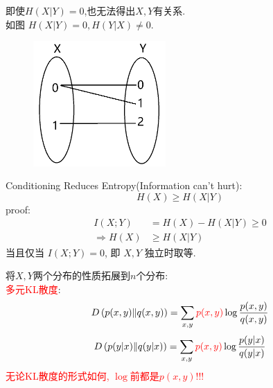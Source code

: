 \begin{proposition}
即使$H(X|Y)=0$,也无法得出$X,Y$有关系.\\
如图 $H(X|Y)=0,H(Y|X)\neq 0$.
\begin{figure}[htbp]
    \centering
    \includegraphics[width=0.45\textwidth]{./figures/conditional_entropy_0.png}
\end{figure}
\end{proposition}

\begin{proposition}
Conditioning Reduces Entropy(Information can't hurt):\\
$$H(X)\geq H(X|Y)$$
proof:
\begin{align*}
I(X;Y) &= H(X) - H(X|Y) \geq 0 \\
\Rightarrow H(X) &\geq H(X|Y)
\end{align*}
当且仅当 $I(X;Y)=0$, 即 $X,Y$ 独立时取等.
\end{proposition}

将$X,Y$两个分布的性质拓展到$n$个分布:\\
\textcolor{red}{多元KL散度}:
$$D\left(p(x,y)\|q(x,y)\right)=\sum_{x,y}\textcolor{red}{p(x,y)}\log\dfrac{p(x,y)}{q(x,y)}$$
$$D\left(p(y|x)\|q(y|x)\right)=\sum_{x,y}\textcolor{red}{p(x,y)}\log\dfrac{p(y|x)}{q(y|x)}$$
\textcolor{red}{无论KL散度的形式如何, $\log$前都是$p(x,y)$!!!}

